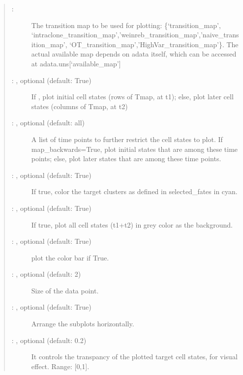\documentclass[letterpaper,10pt,english]{sphinxmanual}
\begin{document}
\begin{fulllineitems}
\begin{quote}
\begin{description}
\begin{description}
\item[{ : }] \leavevmode
The transition map to be used for plotting: \{‘transition\_map’,
‘intraclone\_transition\_map’,’weinreb\_transition\_map’,’naive\_transition\_map’,
‘OT\_transition\_map’,’HighVar\_transition\_map’\}. The actual available
map depends on adata itself, which can be accessed at adata.uns{[}‘available\_map’{]}

\item[{ : , optional (default: True)}] \leavevmode
If , plot initial cell states (rows of Tmap, at t1);
else, plot later cell states (columns of Tmap, at t2)

\item[{ : , optional (default: all)}] \leavevmode
A list of time points to further restrict the cell states to plot.
If map\_backwards=True, plot initial states that are among these time points;
else, plot later states that are among these time points.

\item[{ : , optional (default: True)}] \leavevmode
If true, color the target clusters as defined in selected\_fates in cyan.

\item[{ : , optional (default: True)}] \leavevmode
If true, plot all cell states (t1+t2) in grey color as the background.

\item[{ : , optional (default: True)}] \leavevmode
plot the color bar if True.

\item[{ : , optional (default: 2)}] \leavevmode
Size of the data point.

\item[{ : , optional (default: True)}] \leavevmode
Arrange the subplots horizontally.

\item[{ : , optional (default: 0.2)}] \leavevmode
It controls the transpancy of the plotted target cell states,
for visual effect. Range: {[}0,1{]}.


\end{description}
\end{description}
\end{quote}
\end{fulllineitems}
\end{document}
